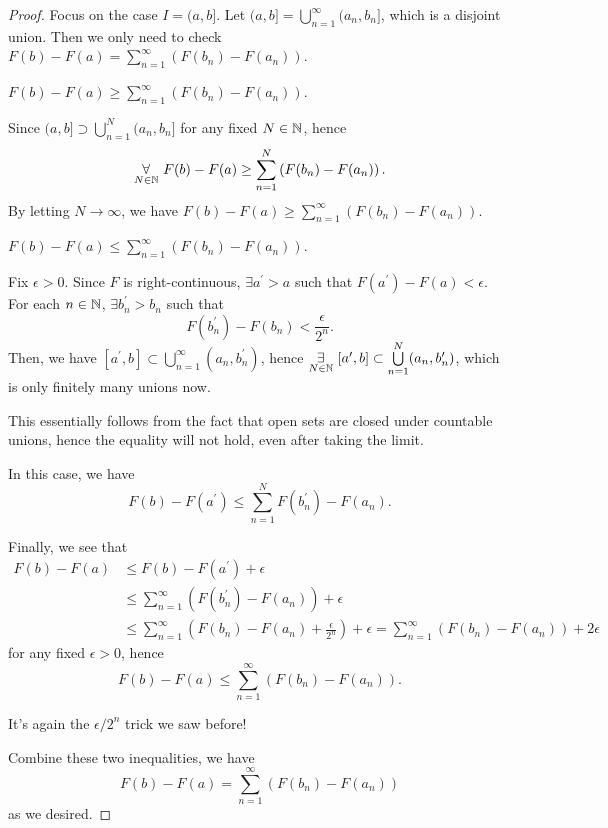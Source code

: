 \begin{proof}
	Focus on the case \(I = (a, b]\). Let \((a, b] = \bigcup_{n=1}^{\infty} (a_{n}, b_{n}]\),
	which is a disjoint union. Then we only need to check \(F(b) - F(a) = \sum\limits_{n=1}^{\infty} \left(F(b_{n}) - F(a_{n})\right)\).
	\begin{claim}
		\(F(b) - F(a) \geq \sum\limits_{n=1}^{\infty} (F(b_{n} ) - F(a_{n} ))\).
	\end{claim}
	\begin{explanation}
		Since \((a, b]\supset \bigcup_{n=1}^{N} (a_{n}, b_{n}]\) for any fixed \(N\in\mathbb{\MakeUppercase{N}} \), hence
		\[
			\underset{N\in\mathbb{\MakeUppercase{N}} }{\forall}\ F(b) - F(a) \geq \sum\limits_{n=1}^{N} \left(F(b_{n}) - F(a_{n})\right).
		\]
		By letting \(N \to \infty\), we have \(F(b) - F(a) \geq \sum\limits_{n=1}^{\infty} \left(F(b_{n}) - F(a_{n})\right)\).
	\end{explanation}
	\begin{claim}
		\(F(b) - F(a) \leq \sum\limits_{n=1}^{\infty} (F(b_{n} ) - F(a_{n} ))\).
	\end{claim}
	\begin{explanation}
		Fix \(\epsilon >0\). Since \(F\) is right-continuous, \(\exists a ^\prime > a\) such that \(F(a ^\prime ) - F(a) <\epsilon\).
		For each \(n\in\mathbb{\MakeUppercase{N}} \), \(\exists b_{n} ^\prime > b_{n}\) such that
		\[
			F(b_{n} ^\prime ) - F(b_{n})<\frac{\epsilon }{2^n}.
		\]
		Then, we have \([a ^\prime , b] \subset \bigcup\limits_{n=1}^{\infty} (a_{n}, b_{n} ^\prime )\), hence
		\(\underset{ N\in\mathbb{\MakeUppercase{N}}}{\exists}\ [a ^\prime , b]\subset \bigcup\limits_{n=1}^{N} (a_{n}, b_{n} ^\prime )\),
		which is only finitely many unions now.
		\begin{remark}
			This essentially follows from the fact that open sets are closed under countable unions, hence the equality will not hold, even after taking the limit.
		\end{remark}

		In this case, we have
		\[
			F(b) - F(a ^\prime ) \leq \sum\limits_{n=1}^{N} F(b_{n} ^\prime ) - F(a_{n}).
		\]


		Finally, we see that
		\[
			\begin{split}
				F(b) - F(a)&\leq F(b) - F(a ^\prime )+\epsilon \\
				&\leq \sum\limits_{n=1}^{\infty} \left(F(b_{n} ^\prime ) - F(a_{n})\right) + \epsilon \\
				&\leq \sum\limits_{n=1}^{\infty} \left(F(b_{n}) - F(a_{n}) + \frac{\epsilon }{2^n}\right) + \epsilon
				= \sum\limits_{n=1}^{\infty} \left(F(b_{n}) - F(a_{n})\right) + 2\epsilon
			\end{split}
		\]
		for any fixed \(\epsilon > 0\), hence
		\[
			F(b) - F(a) \leq \sum\limits_{n=1}^{\infty} (F(b_{n}) - F(a_{n})).
		\]
		\begin{remark}
			It's again the \(\epsilon /2^n\) trick we saw before!
		\end{remark}
	\end{explanation}

	Combine these two inequalities, we have
	\[
		F(b) - F(a) = \sum\limits_{n=1}^{\infty} (F(b_{n}) - F(a_{n}))
	\]
	as we desired.
\end{proof}